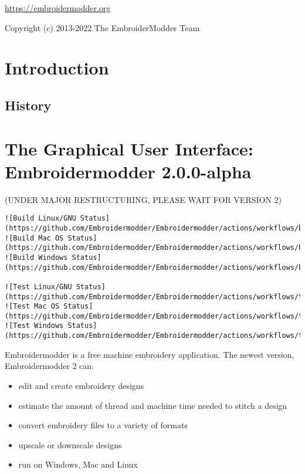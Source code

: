 \documentclass[a4paper, 11pt]{report}
\title{The Embroidermodder Project\\{\small \subtitle}}
\author{The Embroidermodder Team}
\newcommand{\emversion}{2.0.0-alpha}
\begin{document}
\maketitle

\vspace{5in}

{\small
\url{https://embroidermodder.org}

Copyright (c) 2013-2022 The EmbroiderModder Team
}

\pagebreak

\tableofcontents

\chapter{Introduction}

\section{History}

\chapter{The Graphical User Interface: Embroidermodder \emversion}

(UNDER MAJOR RESTRUCTURING, PLEASE WAIT FOR VERSION 2)

\begin{verbatim}
![Build Linux/GNU Status](https://github.com/Embroidermodder/Embroidermodder/actions/workflows/build_linux_gnu.yml/badge.svg)
![Build Mac OS Status](https://github.com/Embroidermodder/Embroidermodder/actions/workflows/build_macos.yml/badge.svg)
![Build Windows Status](https://github.com/Embroidermodder/Embroidermodder/actions/workflows/build_windows.yml/badge.svg)

![Test Linux/GNU Status](https://github.com/Embroidermodder/Embroidermodder/actions/workflows/test_linux_gnu.yml/badge.svg)
![Test Mac OS Status](https://github.com/Embroidermodder/Embroidermodder/actions/workflows/test_macos.yml/badge.svg)
![Test Windows Status](https://github.com/Embroidermodder/Embroidermodder/actions/workflows/test_windows.yml/badge.svg)
\end{verbatim}

Embroidermodder is a free machine embroidery application.
The newest version, Embroidermodder 2 can:

\begin{itemize}
\item edit and create embroidery designs
\item estimate the amount of thread and machine time needed to stitch a design
\item convert embroidery files to a variety of formats
\item upscale or downscale designs
\item run on Windows, Mac and Linux
\end{itemize}
\end{document}
